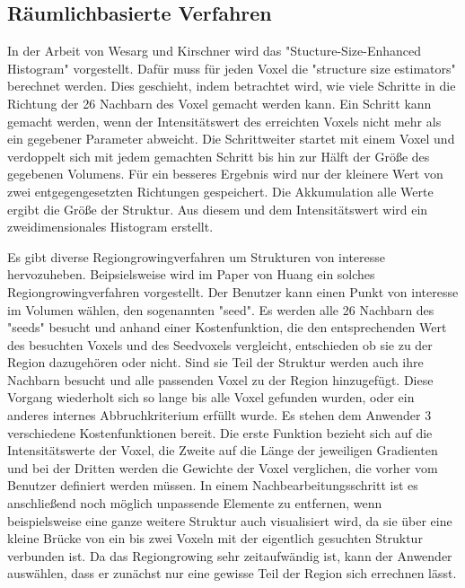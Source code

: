 \subsection{Räumlichbasierte Verfahren}


In der Arbeit von Wesarg und Kirschner \cite{wesarg2009structure, wesarg20102d} wird das "Stucture-Size-Enhanced Histogram" vorgestellt.
\newline
Dafür muss für jeden Voxel die "structure size estimators" berechnet werden. Dies geschieht, indem betrachtet wird, wie viele Schritte in die Richtung der 26 Nachbarn des Voxel gemacht werden kann. Ein Schritt kann gemacht werden, wenn der Intensitätswert des erreichten Voxels nicht mehr als ein gegebener Parameter abweicht. Die Schrittweiter startet mit einem Voxel und verdoppelt sich mit jedem gemachten Schritt bis hin zur Hälft der Größe des gegebenen Volumens. Für ein besseres Ergebnis wird nur der kleinere Wert von zwei entgegengesetzten Richtungen gespeichert. Die Akkumulation alle Werte ergibt die Größe der Struktur. Aus diesem und dem Intensitätswert wird ein zweidimensionales Histogram erstellt.


Es gibt diverse Regiongrowingverfahren um Strukturen von interesse hervozuheben.
\newline
Beipsielsweise wird im Paper von Huang \cite{huang2003rgvis} ein solches Regiongrowingverfahren vorgestellt.
\newline
Der Benutzer kann einen Punkt von interesse im Volumen wählen, den sogenannten "seed". Es werden alle 26 Nachbarn des "seeds" besucht und anhand einer Kostenfunktion, die den entsprechenden Wert des besuchten Voxels und des Seedvoxels vergleicht, entschieden ob sie zu der Region dazugehören oder nicht. Sind sie Teil der Struktur werden auch ihre Nachbarn besucht und alle passenden Voxel zu der Region hinzugefügt. Diese Vorgang wiederholt sich so lange bis alle Voxel gefunden wurden, oder ein anderes internes Abbruchkriterium erfüllt wurde.  Es stehen dem Anwender 3 verschiedene Kostenfunktionen bereit. Die erste Funktion bezieht sich auf die Intensitätswerte der Voxel, die Zweite auf die Länge der jeweiligen Gradienten und bei der Dritten werden die Gewichte der Voxel verglichen, die vorher vom Benutzer definiert werden müssen. In einem Nachbearbeitungsschritt ist es anschließend noch möglich unpassende Elemente zu entfernen, wenn beispielsweise eine ganze weitere Struktur auch visualisiert wird, da sie über eine kleine Brücke von ein bis zwei Voxeln mit der eigentlich gesuchten Struktur verbunden ist.
\newline
Da das Regiongrowing sehr zeitaufwändig ist, kann der Anwender auswählen, dass er zunächst nur eine gewisse Teil der Region sich errechnen lässt.


